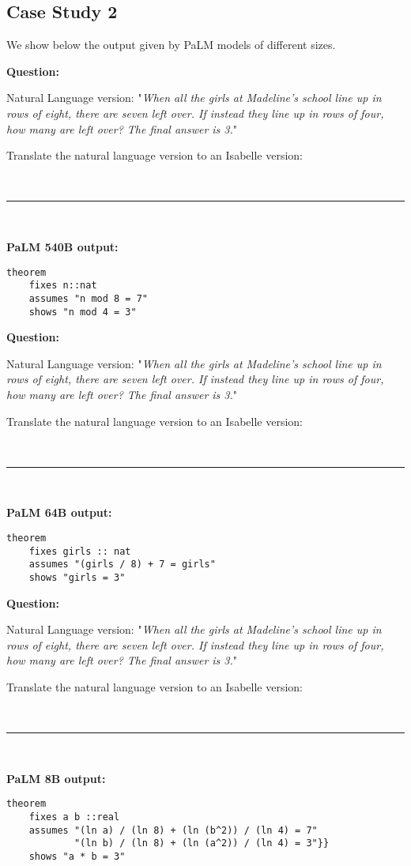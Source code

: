 \documentclass{article}
\begin{document}
\subsection{Case Study 2} 
\label{appendix:case_study_2}
We show below the output given by PaLM models of different sizes.

\begin{boxB}
\textbf{Question:} 

Natural Language version: "\emph{When all the girls at Madeline's school line up in rows of eight, there are seven left over. If instead they line up in rows of four, how many are left over? The final answer is 3.}"

Translate the natural language version to an Isabelle version:



\
\hrule
\

\textbf{PaLM 540B output:} 
\begin{lstlisting}
theorem
    fixes n::nat
    assumes "n mod 8 = 7"
    shows "n mod 4 = 3"
\end{lstlisting}

\end{boxB}

\begin{boxB}
\textbf{Question:} 

Natural Language version: "\emph{When all the girls at Madeline's school line up in rows of eight, there are seven left over. If instead they line up in rows of four, how many are left over? The final answer is 3.}"

Translate the natural language version to an Isabelle version:



\
\hrule
\



\textbf{PaLM 64B output:} 
\begin{lstlisting}
theorem
    fixes girls :: nat
    assumes "(girls / 8) + 7 = girls"
    shows "girls = 3"
\end{lstlisting}
\end{boxB}


\begin{boxB}
\textbf{Question:} 

Natural Language version: "\emph{When all the girls at Madeline's school line up in rows of eight, there are seven left over. If instead they line up in rows of four, how many are left over? The final answer is 3.}"

Translate the natural language version to an Isabelle version:



\
\hrule
\

        
\textbf{PaLM 8B output:} 
\begin{lstlisting}
theorem
    fixes a b ::real
    assumes "(ln a) / (ln 8) + (ln (b^2)) / (ln 4) = 7"
            "(ln b) / (ln 8) + (ln (a^2)) / (ln 4) = 3"}}
    shows "a * b = 3"
\end{lstlisting}
\end{boxB}
\end{document}
